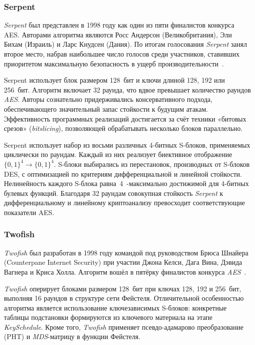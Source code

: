 \subsubsection{Serpent}

\textit{Serpent} был представлен в 1998 году как один из пяти финалистов конкурса
AES. Авторами алгоритма являются Росс Андерсон (Великобритания), Эли Бихам
(Израиль) и Ларс Кнудсен (Дания). По итогам голосования \textit{Serpent} занял второе
место, набрав наибольшее число голосов среди участников, ставивших приоритетом
максимальную безопасность в ущерб производительности~\cite{serpent1998}.

Serpent использует блок размером 128~бит и ключи длиной 128, 192 или 256~бит.
Алгоритм включает 32 раунда, что вдвое превышает количество раундов \textit{AES}.
Авторы сознательно придерживались консервативного подхода, обеспечивающего
значительный запас стойкости к будущим атакам. Эффективность программных
реализаций достигается за счёт техники «битовых срезов» (\textit{bitslicing}),
позволяющей обрабатывать несколько блоков параллельно.

Serpent использует набор из восьми различных 4-битных S-блоков, применяемых
циклически по раундам. Каждый из них реализует биективное отображение
$\{0,1\}^4 \to \{0,1\}^4$. S-блоки выбирались из перестановок, производных
от S-блоков DES, с оптимизацией по критериям дифференциальной и линейной
стойкости. Нелинейность каждого S-блока равна~4~-максимально достижимой
для 4-битных булевых функций. Благодаря 32 раундам совокупная стойкость
\textit{Serpent} к дифференциальному и линейному криптоанализу превосходит
соответствующие показатели AES.

\subsubsection{Twofish}

\textit{Twofish} был разработан в 1998 году командой под руководством Брюса Шнайера
(Counterpane Internet Security) при участии Джона Келси, Дага Вина,
Дэвида Вагнера и Криса Холла. Алгоритм вошёл в пятёрку финалистов конкурса
\textit{AES}~\cite{twofish1998}.

\textit{Twofish} оперирует блоками размером 128~бит при ключах 128, 192 и 256~бит,
выполняя 16 раундов в структуре сети Фейстеля. Отличительной особенностью
алгоритма является использование ключезависимых S-блоков: конкретные таблицы
подстановки формируются из ключевого материала на этапе \textit{KeySchedule}.
Кроме того, \textit{Twofish} применяет псевдо-адамарово преобразование (PHT)
и \textit{MDS}-матрицу в функции Фейстеля.

